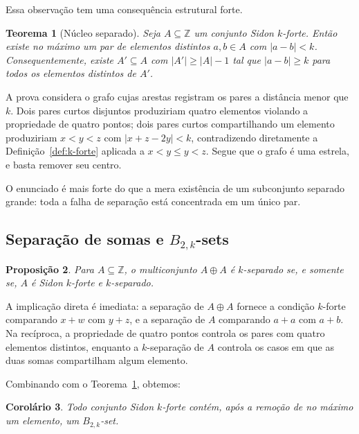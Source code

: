 \documentclass[11pt,a4paper]{article}
\newtheorem{theorem}{Teorema}[section]
\newtheorem{proposition}[theorem]{Proposição}
\newtheorem{corollary}[theorem]{Corolário}
\theoremstyle{definition}
\theoremstyle{remark}
\begin{document}
Essa observação tem uma consequência estrutural forte.

\begin{theorem}[Núcleo separado]
  \label{thm:separated-core}
  Seja \(A\subseteq\mathbb Z\) um conjunto Sidon \(k\)-forte. Então
  existe no máximo um par de elementos distintos \(a,b\in A\) com
  \(|a-b|<k\). Consequentemente, existe \(A'\subseteq A\) com
  \(|A'|\geq|A|-1\) tal que \(|a-b|\geq k\) para todos os elementos
  distintos de \(A'\).
\end{theorem}

A prova considera o grafo cujas arestas registram os pares a distância
menor que \(k\). Dois pares curtos disjuntos produziriam quatro
elementos violando a propriedade de quatro pontos; dois pares curtos
compartilhando um elemento produziriam \(x<y<z\) com \(|x+z-2y|<k\),
contradizendo diretamente a Definição~\ref{def:k-forte} aplicada a
\(x<y\leq y<z\). Segue que o grafo é uma estrela, e basta remover seu
centro.

O enunciado é mais forte do que a mera existência de um subconjunto
separado grande: toda a falha de separação está concentrada em um único
par.

\subsection{Separação de somas e \texorpdfstring{\(B_{2,k}\)}{B2k}-sets}
\label{sec:b2k}

\begin{proposition}
  \label{prop:b2k}
  Para \(A\subseteq\mathbb Z\), o multiconjunto \(A\oplus A\) é
  \(k\)-separado se, e somente se, \(A\) é Sidon \(k\)-forte e
  \(k\)-separado.
\end{proposition}

A implicação direta é imediata: a separação de \(A\oplus A\) fornece a
condição \(k\)-forte comparando \(x+w\) com \(y+z\), e a separação de
\(A\) comparando \(a+a\) com \(a+b\). Na recíproca, a propriedade de
quatro pontos controla os pares com quatro elementos distintos,
enquanto a \(k\)-separação de \(A\) controla os casos em que as duas
somas compartilham algum elemento.

Combinando com o Teorema~\ref{thm:separated-core}, obtemos:

\begin{corollary}
  Todo conjunto Sidon \(k\)-forte contém, após a remoção de no máximo um
  elemento, um \(B_{2,k}\)-set.
\end{corollary}
\end{document}
